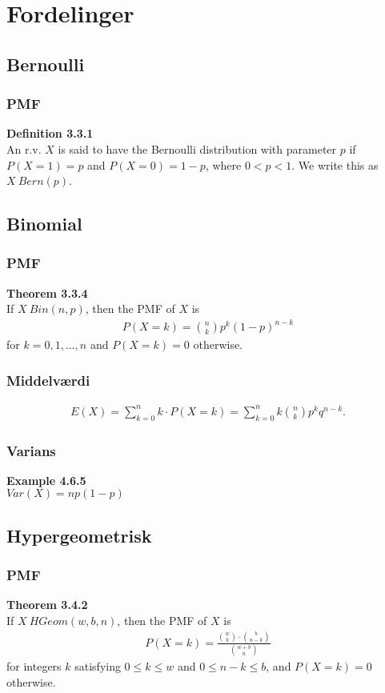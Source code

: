 \documentclass{article}
\begin{document}
\section*{Fordelinger}
\subsection*{Bernoulli}
\subsubsection*{PMF}
\textbf{Definition 3.3.1}\\
An r.v. $X$ is said to have the Bernoulli distribution with parameter $p$ if $P(X = 1) = p$ and $P(X = 0) = 1 - p$, where $0 < p < 1$. We write this as $X ~ Bern(p)$.
\subsection*{Binomial}
\subsubsection*{PMF}
\textbf{Theorem 3.3.4}\\
If $X ~ Bin(n,p)$, then the PMF of $X$ is
\begin{align*}
  P(X = k) = {n \choose k} p^k (1 - p)^{n-k}
\end{align*}
for $k = 0, 1, \hdots, n$ and $P(X = k) = 0$ otherwise.\\
\subsubsection*{Middelværdi}
\begin{align*}
  E(X) = \sum_{k=0}^{n}{k \cdot P(X = k)} = \sum_{k=0}^{n}{k {n \choose k} p^k q^{n-k}}.
\end{align*}
\subsubsection*{Varians}
\textbf{Example 4.6.5}\\
$Var(X) = np(1-p)$

\subsection*{Hypergeometrisk}
\subsubsection*{PMF}
\textbf{Theorem 3.4.2}\\
If $X ~ HGeom(w,b,n)$, then the PMF of $X$ is
\begin{align*}
  P(X = k) = \frac{{w \choose k} \cdot {b \choose n-k}}{{w + b \choose n}}
\end{align*}
for integers $k$ satisfying $0 \leq k \leq w$ and $0 \leq n - k \leq b$, and $P(X = k) = 0$ otherwise.
\end{document}
